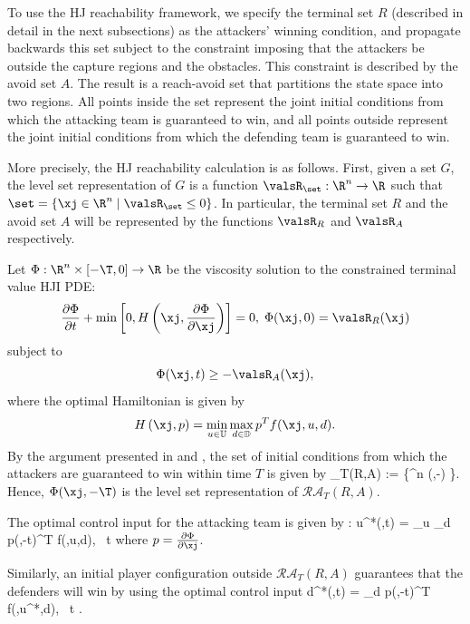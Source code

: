 To use the HJ reachability framework, we specify the terminal set $R$ (described in detail in the next subsections) as the attackers' winning condition, and propagate backwards this set subject to the constraint imposing that the attackers be outside the capture regions and the obstacles. This constraint is described by the avoid set $A$. The result is a reach-avoid set that partitions the state space into two regions. All points inside the set represent the joint initial conditions from which the attacking team is guaranteed to win, and all points outside represent the joint initial conditions from which the defending team is guaranteed to win.

More precisely, the HJ reachability calculation is as follows. 
First, given a set $G$, the level set representation of $G$ is a function $\valsR_\set:\R^n \rightarrow \R$ such that $\set = \left\{\xj\in\R^n \mid \valsR_\set\le0\right\}$.
In particular, the terminal set $R$ and the avoid set $A$ will be represented by the functions $\valsR_R$ and $\valsR_A$ respectively.
 
Let $\Phi:\R^n\times[-\T,0]\rightarrow\R$ be the viscosity solution \cite{j:Crandall-TAMS-1983} to the constrained terminal value HJI PDE:
\begin{equation}
	\label{eq:HJ_PDE_reachavoid}
	\frac{\partial \Phi}{\partial t} + \min \left[0, H\left(\xj,\frac{\partial \Phi}{\partial \xj}\right)\right] = 0,\;\Phi(\xj,0) = \valsR_R(\xj)	 
\end{equation}
subject to 
$$\Phi(\xj,t) \geq -\valsR_A(\xj),$$
where the optimal Hamiltonian is given by
$$H\left(\xj,p\right) = \min_{u \in \mathbb{U}} \max_{d \in \mathbb{D}} p^T f(\xj,u,d).$$
By the argument presented in \cite{j:mitchell-TAC-2005} and \cite{mitchell-thesis}, the set of initial conditions from which the attackers are guaranteed to win within time $T$ is given by 
\bq
{}_T(R,A) := \left\{\xj\in \R^n \mid \Phi (\xj,-\T) \right\}.
\eq
Hence, $\Phi (\xj,-\T)$ is the level set representation of $\mathcal{RA}_T(R,A)$.

The optimal control input for the attacking team is given by \cite{j:Lygeros-automatica-1999, j:Tomlin-ProcIEEE-2000, Huang2011}:
\bq \label{eq:opt_ctrl_u}
  u^*(\xj,t) = \arg \min_{u \in {}} \max_{d \in {}} p(\xj,-t)^T f(\xj,u,d), \!\ t \in [0,T] 
\eq
where $p = \frac{\partial \Phi}{\partial \xj}$. 

Similarly, an initial player configuration outside $\mathcal{RA}_T(R,A)$ guarantees that the defenders will win by using the optimal control input
\bq \label{eq:opt_ctrl_d}
  d^*(\xj,t) = \arg \max_{d \in {}} p(\xj,-t)^T f(\xj,u^*,d), \ t \in [0,T].
\eq


